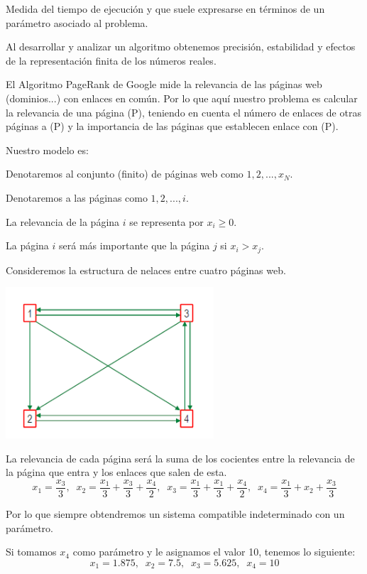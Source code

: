 \begin{ndef}
Medida del tiempo de ejecución y que suele expresarse en términos de un parámetro asociado al problema.
\end{ndef}

Al desarrollar y analizar un algoritmo obtenemos precisión, estabilidad y efectos de la representación finita de los números reales.

El Algoritmo PageRank de Google mide la relevancia de las páginas web (dominios...) con enlaces en común. Por lo que aquí nuestro problema es calcular la relevancia de una página (P), teniendo en cuenta el número de enlaces de otras páginas a (P) y la importancia de las páginas que establecen enlace con (P).

Nuestro modelo es:

Denotaremos al conjunto (finito) de páginas web como $1, 2, ..., x_N$.

Denotaremos a las páginas como $1, 2, ..., i$.

La relevancia de la página $i$ se representa por $x_i \geq 0$.

La página $i$ será más importante que la página $j$ si $x_i > x_j$.

\begin{ejemplo}
Consideremos la estructura de nelaces entre cuatro páginas web.

\includegraphics[scale=0.3]{media/ej1-10.png}

La relevancia de cada página será la suma de los cocientes entre la relevancia de la página que entra y los enlaces que salen de esta.
\[ x_1 = \frac{x_3}{3}, \; \; x_2 = \frac{x_1}{3} + \frac{x_3}{3} + \frac{x_4}{2}, \; \; x_3 = \frac{x_1}{3} + \frac{x_1}{3} + \frac{x_4}{2}, \; \; x_4 = \frac{x_1}{3} + x_2 + \frac{x_3}{3} \]

Por lo que siempre obtendremos un sistema compatible indeterminado con un parámetro.

Si tomamos $x_4$ como parámetro y le asignamos el valor 10, tenemos lo siguiente:
\[ x_1 = 1.875, \; \; x_2 = 7.5, \; \; x_3 = 5.625, \; \; x_4 = 10 \]
\end{ejemplo}

